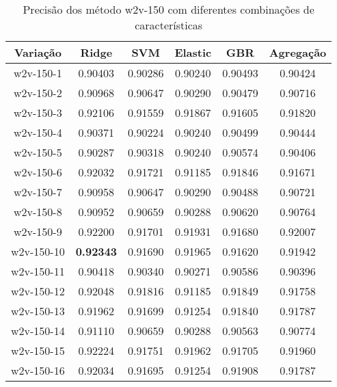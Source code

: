 \begin{table}[H]
\centering
\begin{tabular}{|c| c c  c  c  c| }
\hline
Variação &  Ridge & SVM & Elastic & GBR & Agregação  \\ 
\hline
w2v-150-1 & 0.90403 & 0.90286 & 0.90240 & 0.90493 & 0.90424 \\
\hline
w2v-150-2 & 0.90968 & 0.90647 & 0.90290 & 0.90479 & 0.90716 \\
\hline
w2v-150-3 & 0.92106 & 0.91559 & 0.91867 & 0.91605 & 0.91820 \\
\hline
w2v-150-4 & 0.90371 & 0.90224 & 0.90240 & 0.90499 & 0.90444 \\
\hline
w2v-150-5 & 0.90287 & 0.90318 & 0.90240 & 0.90574 & 0.90406 \\
\hline
w2v-150-6 & 0.92032 & 0.91721 & 0.91185 & 0.91846 & 0.91671 \\
\hline
w2v-150-7 & 0.90958 & 0.90647 & 0.90290 & 0.90488 & 0.90721 \\
\hline
w2v-150-8 & 0.90952 & 0.90659 & 0.90288 & 0.90620 & 0.90764 \\
\hline
w2v-150-9 & 0.92200 & 0.91701 & 0.91931 & 0.91680 & 0.92007 \\
\hline
w2v-150-10 & \textbf{0.92343} & 0.91690 & 0.91965 & 0.91620 & 0.91942 \\
\hline
w2v-150-11 & 0.90418 & 0.90340 & 0.90271 & 0.90586 & 0.90396 \\
\hline
w2v-150-12 & 0.92048 & 0.91816 & 0.91185 & 0.91849 & 0.91758 \\
\hline
w2v-150-13 & 0.91962 & 0.91699 & 0.91254 & 0.91840 & 0.91787 \\
\hline
w2v-150-14 & 0.91110 & 0.90659 & 0.90288 & 0.90563 & 0.90774 \\
\hline
w2v-150-15 & 0.92224 & 0.91751 & 0.91962 & 0.91705 & 0.91960 \\
\hline
w2v-150-16 & 0.92034 & 0.91695 & 0.91254 & 0.91908 & 0.91787 \\
\hline
\end{tabular}
\caption{Precisão dos método w2v-150 com diferentes combinações de características}
\label{tab:precisionw2v150}
\end{table}

